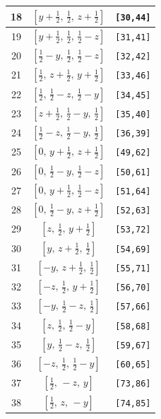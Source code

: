 \documentclass[fleqn,8pt]{jsarticle}
\begin{document}
\begin{longtable}{ccc}
18 & $\left[ y + \frac{1}{2},\, \frac{1}{2},\, z + \frac{1}{2} \right]$ & {\tt [30,44]} \\ \hline
19 & $\left[ y + \frac{1}{2},\, \frac{1}{2},\, \frac{1}{2} - z \right]$ & {\tt [31,41]} \\ \hline
20 & $\left[ \frac{1}{2} - y,\, \frac{1}{2},\, \frac{1}{2} - z \right]$ & {\tt [32,42]} \\ \hline
21 & $\left[ \frac{1}{2},\, z + \frac{1}{2},\, y + \frac{1}{2} \right]$ & {\tt [33,46]} \\ \hline
22 & $\left[ \frac{1}{2},\, \frac{1}{2} - z,\, \frac{1}{2} - y \right]$ & {\tt [34,45]} \\ \hline
23 & $\left[ z + \frac{1}{2},\, \frac{1}{2} - y,\, \frac{1}{2} \right]$ & {\tt [35,40]} \\ \hline
24 & $\left[ \frac{1}{2} - z,\, \frac{1}{2} - y,\, \frac{1}{2} \right]$ & {\tt [36,39]} \\ \hline
25 & $\left[ 0,\, y + \frac{1}{2},\, z + \frac{1}{2} \right]$ & {\tt [49,62]} \\ \hline
26 & $\left[ 0,\, \frac{1}{2} - y,\, \frac{1}{2} - z \right]$ & {\tt [50,61]} \\ \hline
27 & $\left[ 0,\, y + \frac{1}{2},\, \frac{1}{2} - z \right]$ & {\tt [51,64]} \\ \hline
28 & $\left[ 0,\, \frac{1}{2} - y,\, z + \frac{1}{2} \right]$ & {\tt [52,63]} \\ \hline
29 & $\left[ z,\, \frac{1}{2},\, y + \frac{1}{2} \right]$ & {\tt [53,72]} \\ \hline
30 & $\left[ y,\, z + \frac{1}{2},\, \frac{1}{2} \right]$ & {\tt [54,69]} \\ \hline
31 & $\left[ - y,\, z + \frac{1}{2},\, \frac{1}{2} \right]$ & {\tt [55,71]} \\ \hline
32 & $\left[ - z,\, \frac{1}{2},\, y + \frac{1}{2} \right]$ & {\tt [56,70]} \\ \hline
33 & $\left[ - y,\, \frac{1}{2} - z,\, \frac{1}{2} \right]$ & {\tt [57,66]} \\ \hline
34 & $\left[ z,\, \frac{1}{2},\, \frac{1}{2} - y \right]$ & {\tt [58,68]} \\ \hline
35 & $\left[ y,\, \frac{1}{2} - z,\, \frac{1}{2} \right]$ & {\tt [59,67]} \\ \hline
36 & $\left[ - z,\, \frac{1}{2},\, \frac{1}{2} - y \right]$ & {\tt [60,65]} \\ \hline
37 & $\left[ \frac{1}{2},\, - z,\, y \right]$ & {\tt [73,86]} \\ \hline
38 & $\left[ \frac{1}{2},\, z,\, - y \right]$ & {\tt [74,85]} \\ \hline

\end{longtable}
\end{document}
